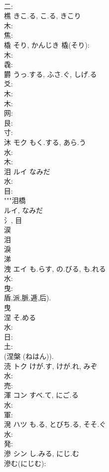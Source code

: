 \documentclass[8pt]{extreport}
\begin{document}
\begin{CJK}{UTF8}{min}
\\	二: 
\\	樵		きこ.る, こ.る, きこり				
\\	木: 
\\	焦: 
\\	橇		そり, かんじき			橇(そり): 
\\	木: 
\\	毳: 
\\	欝		うっ.する, ふさ.ぐ, しげ.る				
\\	爻: 
\\	木: 
\\	木: 
\\	网: 
\\	艮: 
\\	寸: 
\\	沐	モク	もく.する, あら.う		
\\	水: 
\\	木: 
\\	泪	ルイ	なみだ				
\\	水: 
\\	目: 
\\	"""泪橋 
\\	ルイ, なみだ 
\\	氵, 目 
\\	涙
\\	泪
\\	淚 
\\	涕 
\\	洩	エイ	も.らす, の.びる, も.れる		
\\	水: 
\\	曳: 
\\	盾,派,脈,逓,后). 
\\	曳 
\\	涅		そ.める				
\\	水: 
\\	日: 
\\	土: 
\\	(涅槃 (ねはん)). 
\\	涜	トク	けが.す, けが.れ, みぞ		
\\	水: 
\\	売: 
\\	渾	コン	すべ.て, にご.る		
\\	水: 
\\	軍: 
\\	溌	ハツ	も.る, とびち.る, そそ.ぐ		
\\	水: 
\\	発: 
\\	滲	シン	し.みる, にじ.む		
\\	滲む(にじむ): 

\end{CJK}
\end{document}
